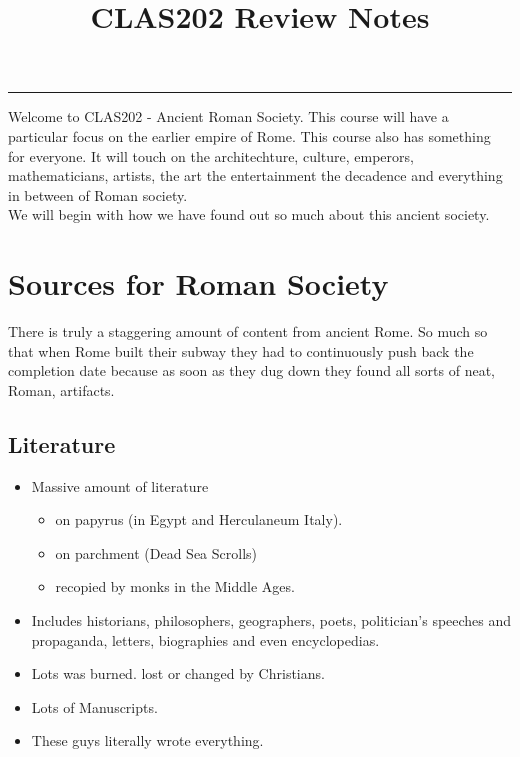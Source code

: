 \documentclass[12pt, twoside]{article}
\title{\textbf{CLAS202 Review Notes}}
\begin{document}
\makeatletter
\hfil\parbox[t]{0.7\textwidth}{\centering\LARGE\bfseries\@title}\par
\kern0.5cm \hrule\kern0.5cm
\makeatother

\renewcommand{\contentsname}{Table of Contents}
\tableofcontents
\clearpage

\setlength{\oddsidemargin}{1.6cm}
\setlength{\evensidemargin}{\oddsidemargin}
\setlength{\marginparwidth}{2.6cm}
\setlength{\marginparsep}{0.25cm}

Welcome to CLAS202 - Ancient Roman Society.  This course will have a particular focus on the earlier empire of Rome.  This course also has something for everyone.  It will touch on the architechture, culture, emperors, mathematicians, artists, the art the entertainment the decadence and everything in between of Roman society. \\

We will begin with how we have found out so much about this ancient society. \\

\section{Sources for Roman Society}

There is truly a staggering amount of content from ancient Rome.  So much so that when Rome built their subway they had to continuously push back the completion date because as soon as they dug down they found all sorts of neat, Roman, artifacts. \\

\subsection{Literature}
\begin{itemize}
\item Massive amount of literature
	\begin{itemize}
	\item on papyrus (in Egypt and Herculaneum Italy).
	\item on parchment (Dead Sea Scrolls)
	\item recopied by monks in the Middle Ages.
	\end{itemize}
\item Includes historians, philosophers, geographers, poets, politician's speeches and propaganda, letters, biographies and even encyclopedias.
\item Lots was burned. lost or changed by Christians.
\item Lots of Manuscripts.
\item These guys literally wrote everything.
\end{itemize}
\end{document}
